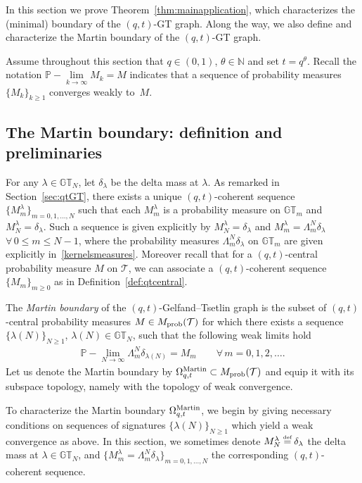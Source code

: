 \documentclass[pdftex]{sigma}
\numberwithin{equation}{section}
\newcommand\myeq{\mathrel{\stackrel{\makebox[0pt]{\mbox{\normalfont\tiny def}}}{=}}}
\newcommand{\N}{\mathbb{N}}
\newcommand{\GT}{\mathbb{GT}}
\newcommand{\Tau}{\mathcal{T}}
\newcommand{\Mart}{\Omega_{q, t}^{\rm Martin}}
\begin{document}
In this section we prove Theorem~\ref{thm:mainapplication}, which characterizes the (minimal) boundary of the $(q, t)$-GT graph. Along the way, we also def\/ine and characterize the Martin boundary of the $(q, t)$-GT graph.

Assume throughout this section that $q\in (0, 1)$, $\theta\in\N$ and set $t = q^{\theta}$.
Recall the notation $\mathbb{P}-\lim\limits_{k\rightarrow\infty}M_k = M$ indicates that a sequence of probability measures $\{M_k\}_{k \geq 1}$ converges weakly to~$M$.

\subsection{The Martin boundary: def\/inition and preliminaries}\label{sec:martindef}

For any $\lambda\in\GT_N$, let $\delta_{\lambda}$ be the delta mass at $\lambda$.
As remarked in Section~\ref{sec:qtGT}, there exists a unique $(q, t)$-coherent sequence $\{M_m^{\lambda}\}_{m = 0, 1, \dots, N}$ such that each $M_m^{\lambda}$ is a probability measure on $\GT_m$ and $M_N^{\lambda} = \delta_{\lambda}$. Such a sequence is given explicitly by $M^{\lambda}_N = \delta_{\lambda}$ and $M^{\lambda}_m = \Lambda^N_m\delta_{\lambda}$ $\forall\, 0\leq m\leq N-1$, where the probability measures $\Lambda^N_m\delta_{\lambda}$ on $\GT_m$ are given explicitly in~\eqref{kernelsmeasures}. Moreover recall that for a $(q, t)$-central probability measure $M$ on $\Tau$, we can associate a $(q, t)$-coherent sequence $\{M_m\}_{m\geq 0}$ as in Def\/inition~\ref{def:qtcentral}.

\begin{df}
The \textit{Martin boundary} of the $(q, t)$-Gelfand--Tsetlin graph is the subset of $(q, t)$-central probability measures $M \in M_{\rm prob}(\Tau)$ for which there exists a sequence $\{\lambda(N)\}_{N\geq 1}$, $\lambda(N)\in\GT_N$, such that the following weak limits hold
\begin{gather*}
\mathbb{P}-\lim_{N\rightarrow\infty}{\Lambda^N_m \delta_{\lambda(N)}} = M_m \qquad \forall\, m = 0, 1, 2, \dots.
\end{gather*}
Let us denote the Martin boundary by $\Mart \subset M_{\rm prob}(\Tau)$ and equip it with its subspace topology, namely with the topology of weak convergence.
\end{df}

To characterize the Martin boundary $\Mart$, we begin by giving necessary conditions on sequences of signatures $\{\lambda(N)\}_{N\geq 1}$ which yield a weak convergence as above. In this section, we sometimes denote $M^{\lambda}_N \myeq \delta_{\lambda}$ the delta mass at $\lambda\in\GT_N$, and $\{M_m^{\lambda} = \Lambda^N_m\delta_{\lambda}\}_{m = 0, 1, \dots, N}$ the corresponding $(q, t)$-coherent sequence.
\end{document}
